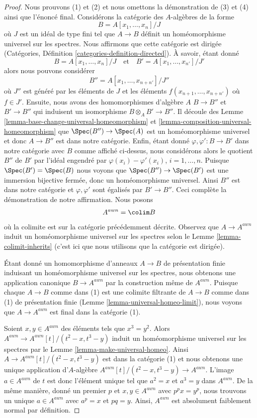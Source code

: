 \begin{proof}
Nous prouvons (1) et (2) et nous omettons la démonstration de (3) et (4) ainsi
que l'énoncé final. Considérons la catégorie des $A$-algèbres de la forme
$$
B = A[x_1, \ldots, x_n]/J
$$
où $J$ est un idéal de type fini tel que $A \to B$ définit un homéomorphisme
universel sur les spectres. Nous affirmons que cette catégorie
est dirigée (Catégories, Définition \ref{categories-definition-directed}). À savoir, étant donné
$$
B = A[x_1, \ldots, x_n]/J
\quad\text{et}\quad
B' = A[x_1, \ldots, x_{n'}]/J'
$$
alors nous pouvons considérer
$$
B'' = A[x_1, \ldots, x_{n + n'}]/J''
$$
où $J''$ est généré par les éléments de $J$ et
les éléments $f(x_{n + 1}, \ldots, x_{n + n'})$ où $f \in J'$. Ensuite,
nous avons des homomorphismes d'algèbre $A$ $B \to B''$
et $B' \to B''$ qui induisent un isomorphisme
$B \otimes_A B' \to B''$.
Il découle des Lemme \ref{lemma-base-change-universal-homeomorphism} et \ref{lemma-composition-universal-homeomorphism}
que $\Spec(B'') \to \Spec(A)$ est un homéomorphisme universel
et donc $A \to B''$ est dans notre catégorie. Enfin,
étant donné $\varphi, \varphi' : B \to B'$ dans notre
catégorie avec $B$ comme affiché
ci-dessus, nous considérons alors
le quotient $B''$ de $B'$
par l'idéal engendré par $\varphi(x_i) - \varphi'(x_i)$, $i = 1, \ldots, n$. Puisque $\Spec(B') = \Spec(B)$ nous
voyons que $\Spec(B'') \to \Spec(B')$ est une immersion bijective fermée, donc
un homéomorphisme universel. Ainsi $B''$ est dans notre
catégorie et $\varphi, \varphi'$ sont égalisés par $B' \to B''$. Ceci complète
la démonstration de notre affirmation. Nous posons
$$
A^{awn} = \colim B
$$
où la colimite est sur la catégorie précédemment décrite. Observez que
$A \to A^{awn}$ induit un homéomorphisme universel sur les spectres selon
le Lemme \ref{lemma-colimit-inherits} (c'est ici que nous utilisons que la catégorie est
dirigée).

\medskip\noindent Étant
donné un homomorphisme d'anneaux $A \to B$ de présentation finie induisant
un homéomorphisme universel sur les spectres, nous obtenons une application canonique
$B \to A^{awn}$ par la construction même de $A^{awn}$. Puisque chaque
$A \to B$ comme dans (1) est une colimite filtrante de $A \to B$ comme
dans (1) de présentation finie (Lemme \ref{lemma-universal-homeo-limit}), nous voyons
que $A \to A^{awn}$ est final dans la catégorie (1).

\medskip\noindent
Soient $x, y \in A^{awn}$ des éléments tels que $x^3 = y^2$.
Alors $A^{awn} \to A^{awn}[t]/(t^2 - x, t^3 - y)$ induit un homéomorphisme universel
sur les spectres par le Lemme \ref{lemma-make-universal-homeo}. Ainsi $A \to A^{awn}[t]/(t^2 - x, t^3 - y)$ est dans
la catégorie (1) et nous obtenons une unique application
d'$A$-algèbre $A^{awn}[t]/(t^2 - x, t^3 - y) \to A^{awn}$.
L'image $a \in A^{awn}$ de $t$ est donc
l'élément unique tel que $a^2 = x$ et $a^3 = y$
dans $A^{awn}$. De la même manière, donné un
premier $p$ et $x, y \in A^{awn}$ avec $p^px = y^p$, nous trouvons
un unique $a \in A^{awn}$ avec $a^p = x$ et $pq = y$.
Ainsi, $A^{awn}$ est absolument faiblement normal
par définition.


\end{proof}
